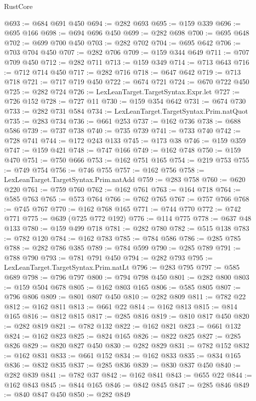 \begin{lexlean}{RustCore}
\begin{coremodule}
@693 := @684 @691 @450
@694 := @282 @693
@695 := @159 @339
@696 := @695 @166
@698 := @694 @696 @450
@699 := @282 @698
@700 := @695 @648
@702 := @699 @700 @450
@703 := @282 @702
@704 := @695 @642
@706 := @703 @704 @450
@707 := @282 @706
@709 := @159 @344 @649
@711 := @707 @709 @450
@712 := @282 @711
@713 := @159 @349
@714 := @713 @643
@716 := @712 @714 @450
@717 := @282 @716
@718 := @647 @642
@719 := @713 @718
@721 := @717 @719 @450
@722 := @674 @721
@724 := @670 @722 @450
@725 := @282 @724
@726 := LexLeanTarget.TargetSyntax.Expr.let
@727 := @726 @152
@728 := @727 @11
@730 := @159 @354 @642
@731 := @674 @730
@733 := @282 @731 @584
@734 := LexLeanTarget.TargetSyntax.Prim.natQuot
@735 := @283 @734
@736 := @661 @253
@737 := @162 @736
@738 := @688 @586
@739 := @737 @738
@740 := @735 @739
@741 := @733 @740
@742 := @728 @741
@744 := @172 @243 @133
@745 := @173 @38
@746 := @159 @359
@747 := @159 @421
@748 := @747 @166
@749 := @162 @748
@750 := @159 @470
@751 := @750 @666
@753 := @162 @751 @165
@754 := @219 @753
@755 := @749 @754
@756 := @746 @755
@757 := @162 @756
@758 := LexLeanTarget.TargetSyntax.Prim.natAdd
@759 := @283 @758
@760 := @620 @220
@761 := @759 @760
@762 := @162 @761
@763 := @164 @718
@764 := @585 @763
@765 := @573 @764
@766 := @762 @765
@767 := @757 @766
@768 := @745 @767
@770 := @162 @768 @165
@771 := @744 @770
@772 := @742 @771
@775 := @639 (@725 @772 @192)
@776 := @114 @775
@778 := @637 @48 @133
@780 := @159 @499 @718
@781 := @282 @780
@782 := @515 @138
@783 := @782 @120
@784 := @162 @783
@785 := @784 @586
@786 := @285 @785
@788 := @282 @786 @385
@789 := @784 @599
@790 := @285 @789
@791 := @788 @790
@793 := @781 @791 @450
@794 := @282 @793
@795 := LexLeanTarget.TargetSyntax.Prim.natLt
@796 := @283 @795
@797 := @585 @689
@798 := @796 @797
@800 := @794 @798 @450
@801 := @282 @800
@803 := @159 @504 @678
@805 := @162 @803 @165
@806 := @585 @805
@807 := @796 @806
@809 := @801 @807 @450
@810 := @282 @809
@811 := @782 @22
@812 := @162 @811
@813 := @661 @22
@814 := @162 @813
@815 := @814 @165
@816 := @812 @815
@817 := @285 @816
@819 := @810 @817 @450
@820 := @282 @819
@821 := @782 @132
@822 := @162 @821
@823 := @661 @132
@824 := @162 @823
@825 := @824 @165
@826 := @822 @825
@827 := @285 @826
@829 := @820 @827 @450
@830 := @282 @829
@831 := @782 @152
@832 := @162 @831
@833 := @661 @152
@834 := @162 @833
@835 := @834 @165
@836 := @832 @835
@837 := @285 @836
@839 := @830 @837 @450
@840 := @282 @839
@841 := @782 @37
@842 := @162 @841
@843 := @655 @22
@844 := @162 @843
@845 := @844 @165
@846 := @842 @845
@847 := @285 @846
@849 := @840 @847 @450
@850 := @282 @849

\end{coremodule}
\end{lexlean}
